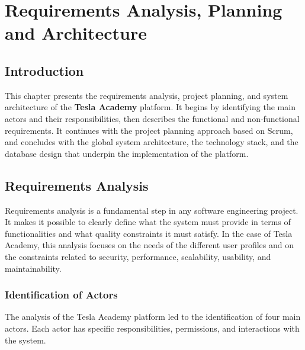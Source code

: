 
\chapter{Requirements Analysis, Planning and Architecture}
\minitoc
\newpage

\section*{Introduction}

This chapter presents the requirements analysis, project planning, and system architecture
of the \textbf{Tesla Academy} platform. It begins by identifying the main actors and their
responsibilities, then describes the functional and non-functional requirements. It
continues with the project planning approach based on Scrum, and concludes with the global
system architecture, the technology stack, and the database design that underpin the
implementation of the platform.

\section{Requirements Analysis}

Requirements analysis is a fundamental step in any software engineering project. It makes
it possible to clearly define what the system must provide in terms of functionalities and
what quality constraints it must satisfy. In the case of Tesla Academy, this analysis
focuses on the needs of the different user profiles and on the constraints related to
security, performance, scalability, usability, and maintainability.

\subsection{Identification of Actors}

The analysis of the Tesla Academy platform led to the identification of four main actors.
Each actor has specific responsibilities, permissions, and interactions with the system.


